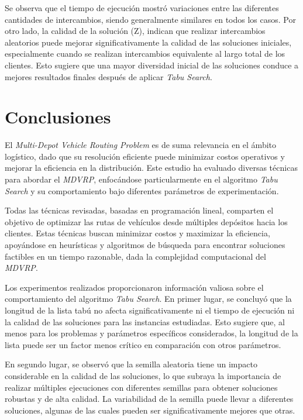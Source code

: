 \documentclass[letter, 10pt]{article}
\begin{document}
Se observa que el tiempo de ejecución mostró variaciones entre las diferentes cantidades de intercambios, siendo generalmente similares en todos los casos. Por otro lado, la calidad de la solución (Z), indican que realizar intercambios aleatorios puede mejorar significativamente la calidad de las soluciones iniciales, especialmente cuando se realizan intercambios equivalente al largo total de los clientes. Esto sugiere que una mayor diversidad inicial de las soluciones conduce a mejores resultados finales después de aplicar \textit{Tabu Search}.

\section{Conclusiones}

El \textit{Multi-Depot Vehicle Routing Problem} es de suma relevancia en el ámbito logístico, dado que su resolución eficiente puede minimizar costos operativos y mejorar la eficiencia en la distribución. Este estudio ha evaluado diversas técnicas para abordar el \textit{MDVRP}, enfocándose particularmente en el algoritmo \textit{Tabu Search} y su comportamiento bajo diferentes parámetros de experimentación.

Todas las técnicas revisadas, basadas en programación lineal, comparten el objetivo de optimizar las rutas de vehículos desde múltiples depósitos hacia los clientes. Estas técnicas buscan minimizar costos y maximizar la eficiencia, apoyándose en heurísticas y algoritmos de búsqueda para encontrar soluciones factibles en un tiempo razonable, dada la complejidad computacional del \textit{MDVRP}.

Los experimentos realizados proporcionaron información valiosa sobre el comportamiento del algoritmo \textit{Tabu Search}. En primer lugar, se concluyó que la longitud de la lista tabú no afecta significativamente ni el tiempo de ejecución ni la calidad de las soluciones para las instancias estudiadas. Esto sugiere que, al menos para los problemas y parámetros específicos considerados, la longitud de la lista puede ser un factor menos crítico en comparación con otros parámetros.

En segundo lugar, se observó que la semilla aleatoria tiene un impacto considerable en la calidad de las soluciones, lo que subraya la importancia de realizar múltiples ejecuciones con diferentes semillas para obtener soluciones robustas y de alta calidad. La variabilidad de la semilla puede llevar a diferentes soluciones, algunas de las cuales pueden ser significativamente mejores que otras.
\end{document}
